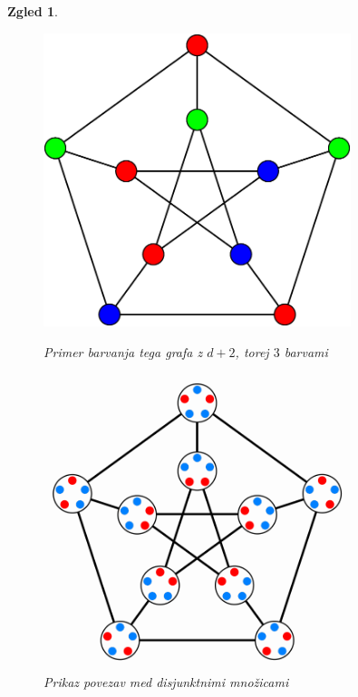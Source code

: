 \documentclass[a4paper,12pt]{article}
\newtheorem{zgled}{Zgled}
\begin{document}
\begin{zgled}
{\begin{figure}[h!]
	\centering
	\begin{minipage}{0.45\textwidth}
		\centering
		\includegraphics[width=0.8\textwidth]{petersenov_graf_barvanje}
        	\caption{Primer barvanja tega grafa z $d+2$, torej $3$ barvami}
    	\end{minipage}\hfill
    	\begin{minipage}{0.45\textwidth}
       	 \centering
        	 \includegraphics[width=0.8\textwidth]{petersenov_graf_mnozice}
       	 \caption{Prikaz povezav med disjunktnimi množicami}
    	\end{minipage}
\end{figure}
}

\end{zgled}
\end{document}
